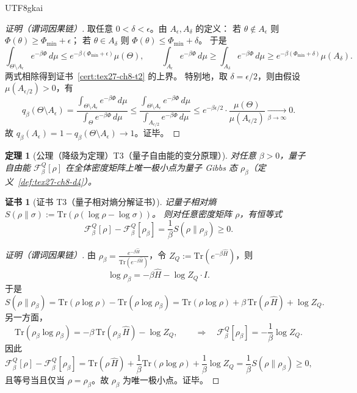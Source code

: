 \documentclass[12pt]{article}
\newtheorem{theorem}{定理}[section]
\newtheorem{Certificate}{证书}[section]
\begin{document}
\begin{CJK*}{UTF8}{gkai}
\begin{proof}[证明（谓词因果链）]
取任意 $0<\delta<\epsilon$。由 $A_\epsilon,A_\delta$ 的定义：
若 $\theta\notin A_\epsilon$ 则 $\Phi(\theta)\ge \Phi_{\min}+\epsilon$；
若 $\theta\in A_\delta$ 则 $\Phi(\theta)\le \Phi_{\min}+\delta$。
于是
\[
  \int_{\Theta\setminus A_\epsilon} e^{-\beta\Phi}\,d\mu
  \le e^{-\beta(\Phi_{\min}+\epsilon)}\mu(\Theta),
  \qquad
  \int_{A_\epsilon} e^{-\beta\Phi}\,d\mu
  \ge \int_{A_\delta} e^{-\beta\Phi}\,d\mu
  \ge e^{-\beta(\Phi_{\min}+\delta)}\mu(A_\delta).
\]
两式相除得到证书~\ref{cert:tex27-ch8-t2} 的上界。
特别地，取 $\delta=\epsilon/2$，则由假设 $\mu(A_{\epsilon/2})>0$，有
\[
  q_\beta(\Theta\setminus A_\epsilon)
  =\frac{\int_{\Theta\setminus A_\epsilon} e^{-\beta\Phi}\,d\mu}{\int_\Theta e^{-\beta\Phi}\,d\mu}
  \le \frac{\int_{\Theta\setminus A_\epsilon} e^{-\beta\Phi}\,d\mu}{\int_{A_{\epsilon/2}} e^{-\beta\Phi}\,d\mu}
  \le e^{-\beta\epsilon/2}\cdot \frac{\mu(\Theta)}{\mu(A_{\epsilon/2})}\xrightarrow[\beta\to\infty]{}0.
\]
故 $q_\beta(A_\epsilon)=1-q_\beta(\Theta\setminus A_\epsilon)\to 1$。证毕。
\end{proof}

\begin{theorem}[公理（降级为定理）T3（量子自由能的变分原理）]
\label{thm:tex27-ch8-t3}
对任意 $\beta>0$，量子自由能 $\mathcal{F}^Q_\beta[\rho]$ 在全体密度矩阵上唯一极小点为量子 Gibbs 态 $\rho_\beta$（定义~\ref{def:tex27-ch8-d4}）。
\end{theorem}

\begin{Certificate}[证书 T3（量子相对熵分解证书）]
\label{cert:tex27-ch8-t3}
记量子相对熵 $S(\rho\|\sigma):=\mathrm{Tr}(\rho(\log\rho-\log\sigma))$。
则对任意密度矩阵 $\rho$，有恒等式
\[
  \mathcal{F}^Q_\beta[\rho]-\mathcal{F}^Q_\beta[\rho_\beta]
  =\frac{1}{\beta}S(\rho\|\rho_\beta)\ge 0.
\]
\end{Certificate}

\begin{proof}[证明（谓词因果链）]
由 $\rho_\beta=\frac{e^{-\beta\widehat{H}}}{\mathrm{Tr}(e^{-\beta\widehat{H}})}$，令 $Z_Q:=\mathrm{Tr}(e^{-\beta\widehat{H}}
  )$，则
\[
  \log\rho_\beta=-\beta\widehat{H}-\log Z_Q\cdot I.
\]
于是
\[
  S(\rho\|\rho_\beta)
  =\mathrm{Tr}(\rho\log\rho)-\mathrm{Tr}(\rho\log\rho_\beta)
  =\mathrm{Tr}(\rho\log\rho)+\beta\,\mathrm{Tr}(\rho\,\widehat{H})+\log Z_Q.
\]
另一方面，
\[
  \mathrm{Tr}(\rho_\beta\log\rho_\beta)
  =-\beta\,\mathrm{Tr}(\rho_\beta\,\widehat{H})-\log Z_Q,
  \qquad
  \Rightarrow\quad
  \mathcal{F}^Q_\beta[\rho_\beta]=-\frac{1}{\beta}\log Z_Q.
\]
因此
\[
  \mathcal{F}^Q_\beta[\rho]-\mathcal{F}^Q_\beta[\rho_\beta]
  =\mathrm{Tr}(\rho\,\widehat{H})+\frac{1}{\beta}\mathrm{Tr}(\rho\log\rho)+\frac{1}{\beta}\log Z_Q
  =\frac{1}{\beta}S(\rho\|\rho_\beta)\ge 0,
\]
且等号当且仅当 $\rho=\rho_\beta$。故 $\rho_\beta$ 为唯一极小点。证毕。
\end{proof}


\end{CJK*}
\end{document}
